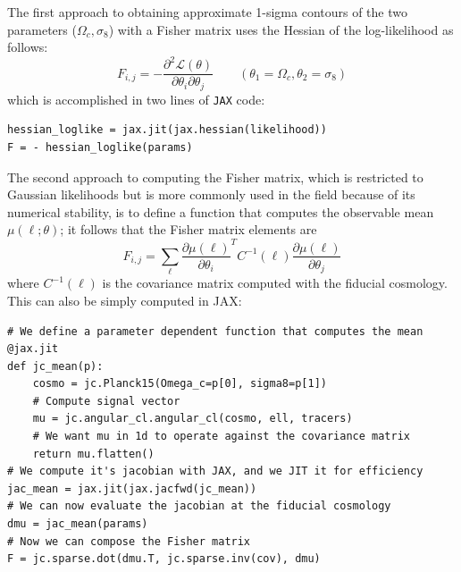 \documentclass[twocolumn,twocolappendix,nofootinbib,iop]{openjournal}
\begin{document}
The first approach to obtaining approximate 1-sigma contours of the two parameters ($\Omega_c, \sigma_8$) with a Fisher matrix uses the Hessian of the log-likelihood as follows:
\begin{equation}
F_{i,j} = - \frac{\partial^2\mathcal{L}(\theta)}{\partial \theta_i \partial \theta_j}
\qquad (\theta_1=\Omega_c, \theta_2=\sigma_8)
\label{eq:fisher_way1}
\end{equation}
which is accomplished in two lines of \texttt{JAX} code:
\begin{lstlisting}[language=iPython]
hessian_loglike = jax.jit(jax.hessian(likelihood))
F = - hessian_loglike(params)
\end{lstlisting}

The second approach to computing the Fisher matrix, which is restricted to Gaussian likelihoods but is more commonly used in the field because of its numerical stability, is to define a function that computes the observable mean  $\mu(\ell; \theta)$; it follows that the Fisher matrix elements are
\begin{equation}
    F_{i,j} = \sum_\ell \frac{\partial \mu(\ell)}{\partial \theta_i}^T C^{-1}(\ell)\frac{\partial \mu(\ell)}{\partial \theta_j}
    \label{eq:fisher_way2}
\end{equation}
where $C^{-1}(\ell)$ is the covariance matrix computed with the fiducial cosmology. This can also be simply computed in JAX: 
\begin{lstlisting}[language=iPython]
# We define a parameter dependent function that computes the mean
@jax.jit
def jc_mean(p):
    cosmo = jc.Planck15(Omega_c=p[0], sigma8=p[1])
    # Compute signal vector
    mu = jc.angular_cl.angular_cl(cosmo, ell, tracers)
    # We want mu in 1d to operate against the covariance matrix
    return mu.flatten() 
# We compute it's jacobian with JAX, and we JIT it for efficiency
jac_mean = jax.jit(jax.jacfwd(jc_mean))
# We can now evaluate the jacobian at the fiducial cosmology
dmu = jac_mean(params)
# Now we can compose the Fisher matrix
F = jc.sparse.dot(dmu.T, jc.sparse.inv(cov), dmu)
\end{lstlisting}
\end{document}
